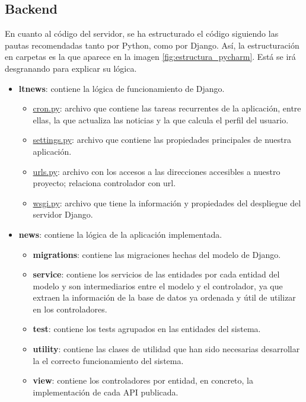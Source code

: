 \subsection{Backend}

En cuanto al código del servidor, se ha estructurado el código siguiendo las pautas recomendadas tanto por Python, como por Django. Así, la estructuración en carpetas es la que aparece en la imagen \ref{fig:estructura_pycharm}. Está se irá desgranando para explicar su lógica.


\begin{itemize}
    \item \textbf{ltnews}: contiene la lógica de funcionamiento de Django.
    \begin{itemize}
        \item \underline{cron.py}: archivo que contiene las tareas recurrentes de la aplicación, entre ellas, la que actualiza las noticias y la que calcula el perfil del usuario.
        \item \underline{settings.py}: archivo que contiene las propiedades principales de nuestra aplicación.
        \item \underline{urls.py}: archivo con los accesos a las direcciones accesibles a nuestro proyecto; relaciona controlador con url.
        \item \underline{wsgi.py}: archivo que tiene la información y propiedades del despliegue del servidor Django.
    \end{itemize}
    \item \textbf{news}: contiene la lógica de la aplicación implementada.
    \begin{itemize}
        \item \textbf{migrations}: contiene las migraciones hechas del modelo de Django.
        \item \textbf{service}: contiene los servicios de las entidades por cada entidad del modelo y son intermediarios entre el modelo y el controlador, ya que extraen la información de la base de datos ya ordenada y útil de utilizar en los controladores.
        \item \textbf{test}: contiene los tests agrupados en las entidades del sistema.
        \item \textbf{utility}: contiene las clases de utilidad que han sido necesarias desarrollar la el correcto funcionamiento del sistema.
        \item \textbf{view}: contiene los controladores por entidad, en concreto, la implementación de cada API publicada.

\end{itemize}
\end{itemize}
